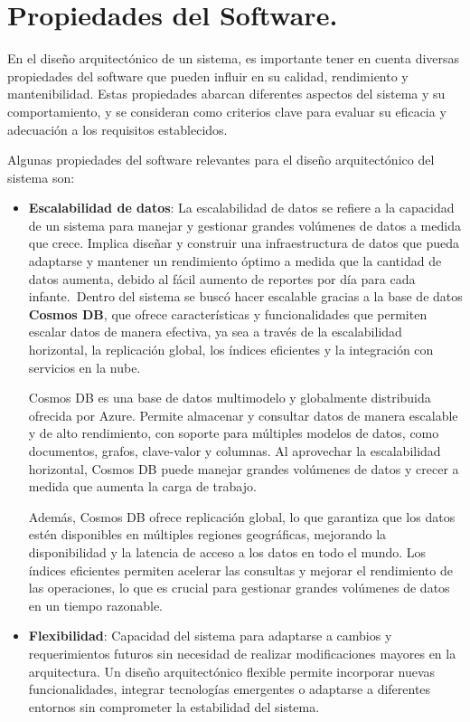 \section{Propiedades del Software.}
En el diseño arquitectónico de un sistema, es importante tener en cuenta diversas propiedades del software que pueden influir en su calidad, rendimiento y mantenibilidad. Estas propiedades abarcan diferentes aspectos del sistema y su comportamiento, y se consideran como criterios clave para evaluar su eficacia y adecuación a los requisitos establecidos.

Algunas propiedades del software relevantes para el diseño arquitectónico del sistema son:

\begin{itemize}
\item \textbf{Escalabilidad de datos}: La escalabilidad de datos se refiere a la capacidad de un sistema para manejar y gestionar grandes volúmenes de datos a medida que crece. Implica diseñar y construir una infraestructura de datos que pueda adaptarse y mantener un rendimiento óptimo a medida que la cantidad de datos aumenta, debido al fácil aumento de reportes por día para cada infante.\
Dentro del sistema se buscó hacer escalable gracias a la base de datos \textbf{Cosmos DB}, que ofrece características y funcionalidades que permiten escalar datos de manera efectiva, ya sea a través de la escalabilidad horizontal, la replicación global, los índices eficientes y la integración con servicios en la nube.

Cosmos DB es una base de datos multimodelo y globalmente distribuida ofrecida por Azure. Permite almacenar y consultar datos de manera escalable y de alto rendimiento, con soporte para múltiples modelos de datos, como documentos, grafos, clave-valor y columnas. Al aprovechar la escalabilidad horizontal, Cosmos DB puede manejar grandes volúmenes de datos y crecer a medida que aumenta la carga de trabajo.

Además, Cosmos DB ofrece replicación global, lo que garantiza que los datos estén disponibles en múltiples regiones geográficas, mejorando la disponibilidad y la latencia de acceso a los datos en todo el mundo. Los índices eficientes permiten acelerar las consultas y mejorar el rendimiento de las operaciones, lo que es crucial para gestionar grandes volúmenes de datos en un tiempo razonable.


\item \textbf{Flexibilidad}: Capacidad del sistema para adaptarse a cambios y requerimientos futuros sin necesidad de realizar modificaciones mayores en la arquitectura. Un diseño arquitectónico flexible permite incorporar nuevas funcionalidades, integrar tecnologías emergentes o adaptarse a diferentes entornos sin comprometer la estabilidad del sistema.


\end{itemize}
